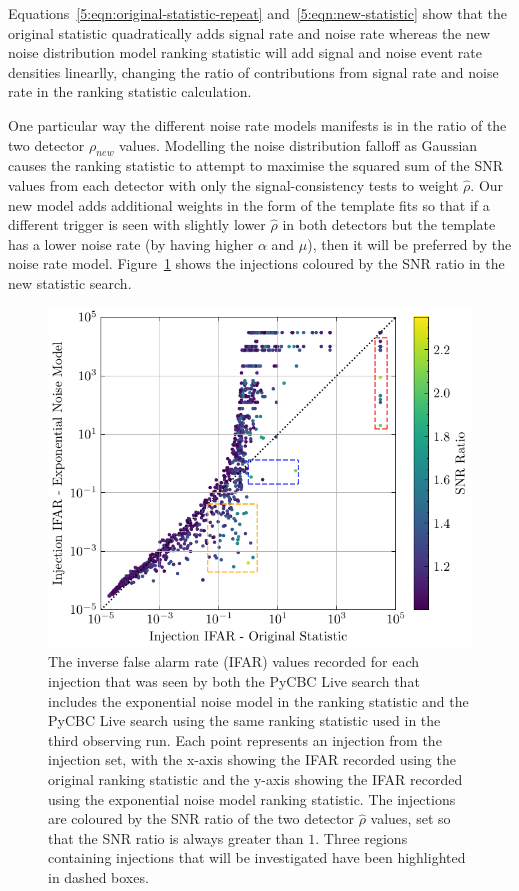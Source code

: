 Equations~\ref{5:eqn:original-statistic-repeat} and~\ref{5:eqn:new-statistic} show that the original statistic quadratically adds signal rate and noise rate whereas the new noise distribution model ranking statistic will add signal and noise event rate densities linearlly, changing the ratio of contributions from signal rate and noise rate in the ranking statistic calculation.

One particular way the different noise rate models manifests is in the ratio of the two detector $\rho_{new}$ values. Modelling the noise distribution falloff as Gaussian causes the ranking statistic to attempt to maximise the squared sum of the SNR values from each detector with only the signal-consistency tests to weight $\hat{\rho}$. Our new model adds additional weights in the form of the template fits so that if a different trigger is seen with slightly lower $\hat{\rho}$ in both detectors but the template has a lower noise rate (by having higher $\alpha$ and $\mu$), then it will be preferred by the noise rate model. Figure~\ref{5:fig:ifar-ifar-snr-ratio} shows the injections coloured by the SNR ratio in the new statistic search.
%
\begin{figure}
  \centering
  \begin{minipage}[t]{1.0\linewidth}
    \includegraphics[width=1\textwidth]{images/5_pycbclive/regions/fits_only_ifar_vs_ifar_regions_snr_ratio.pdf}
  \end{minipage}
  \caption{The inverse false alarm rate (IFAR) values recorded for each injection that was seen by both the PyCBC Live search that includes the exponential noise model in the ranking statistic and the PyCBC Live search using the same ranking statistic used in the third observing run. Each point represents an injection from the injection set, with the x-axis showing the IFAR recorded using the original ranking statistic and the y-axis showing the IFAR recorded using the exponential noise model ranking statistic. The injections are coloured by the SNR ratio of the two detector $\hat{\rho}$ values, set so that the SNR ratio is always greater than $1$. Three regions containing injections that will be investigated have been highlighted in dashed boxes.}
  \label{5:fig:ifar-ifar-snr-ratio}
\end{figure}
